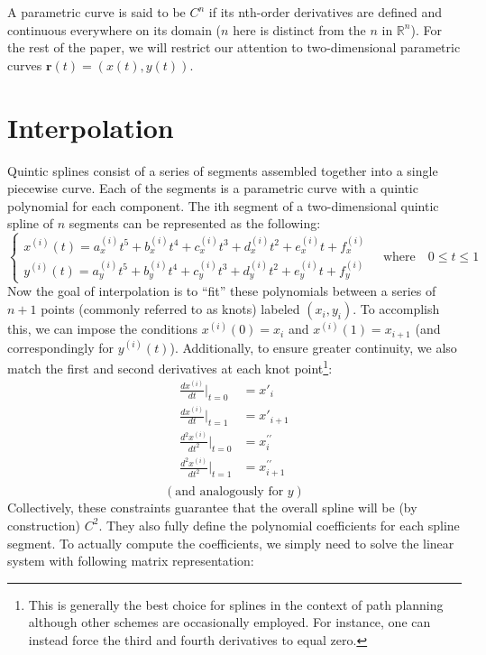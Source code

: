 \documentclass{article}
\begin{document}
A parametric curve is said to be $C^n$ if its nth-order derivatives are defined and continuous everywhere on its domain ($n$ here is distinct from the $n$ in $\mathbb R^n$). For the rest of the paper, we will restrict our attention to two-dimensional parametric curves $\mathbf{r}(t)=(x(t), y(t))$.

\section{Interpolation}
Quintic splines consist of a series of segments assembled together into a single piecewise curve. Each of the segments is a parametric curve with a quintic polynomial for each component. The ith segment of a two-dimensional quintic spline of $n$ segments can be represented as the following:
$$
    \begin{cases}
        x^{(i)}(t) = a^{(i)}_xt^5 + b^{(i)}_xt^4 + c^{(i)}_xt^3 + d^{(i)}_xt^2 + e^{(i)}_xt + f^{(i)}_x\\
        y^{(i)}(t) = a^{(i)}_yt^5 + b^{(i)}_yt^4 + c^{(i)}_yt^3 + d^{(i)}_yt^2 + e^{(i)}_yt + f^{(i)}_y
    \end{cases}
    \quad \text{where} \quad 0 \leq t \leq 1
$$
Now the goal of interpolation is to ``fit'' these polynomials between a series of $n+1$ points (commonly referred to as knots) labeled $(x_i, y_i)$. To accomplish this, we can impose the conditions $x^{(i)}(0) = x_i$ and $x^{(i)}(1) = x_{i+1}$ (and correspondingly for $y^{(i)}(t)$). Additionally, to ensure greater continuity, we also match the first and second derivatives at each knot point\footnote{This is generally the best choice for splines in the context of path planning although other schemes are occasionally employed. For instance, one can instead force the third and fourth derivatives to equal zero.}:
\begin{equation*}
\begin{split}
    \frac{dx^{(i)}}{dt}\biggr\rvert_{t=0} &= x'_i\\
    \frac{dx^{(i)}}{dt}\biggr\rvert_{t=1} &= x'_{i+1}\\
    \frac{d^2x^{(i)}}{dt^2}\biggr\rvert_{t=0} &= x^{\prime\prime}_i\\
    \frac{d^2x^{(i)}}{dt^2}\biggr\rvert_{t=1} &= x^{\prime\prime}_{i+1}\\
\end{split}
\end{equation*}
$$(\text{and analogously for }y)$$
Collectively, these constraints guarantee that the overall spline will be (by construction) $C^2$. They also fully define the polynomial coefficients for each spline segment. To actually compute the coefficients, we simply need to solve the linear system with following matrix representation:
\end{document}
